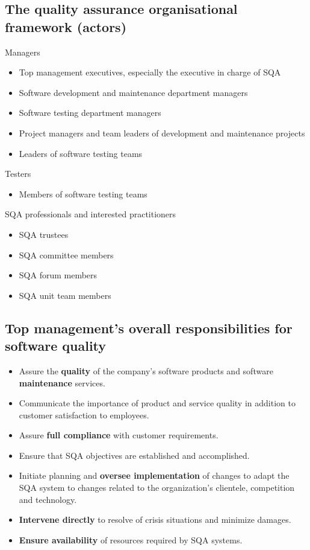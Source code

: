 \documentclass{article}
\begin{document}
\subsection{The quality assurance organisational framework (actors)}

\begin{flushleft}
Managers
\begin{itemize}
  \item Top management executives, especially the executive in charge of SQA
  \item Software development and maintenance department managers
  \item Software testing department managers
  \item Project managers and team leaders of development and maintenance projects
  \item Leaders of software testing teams
\end{itemize}
Testers
\begin{itemize}  
  \item Members of software testing teams
\end{itemize}
SQA professionals and interested practitioners
\begin{itemize}
  \item SQA trustees
  \item SQA committee members
  \item SQA forum members
  \item SQA unit team members
\end{itemize}
\end{flushleft}

\subsection{Top management’s overall responsibilities for software quality}

\begin{itemize}
  \item Assure the \textbf{quality} of the company’s software products and software \textbf{maintenance} services.
  \item Communicate the importance of product and service quality in addition to customer satisfaction to employees.
  \item Assure \textbf{full compliance} with customer requirements.
  \item Ensure that SQA objectives are established and accomplished.
  \item Initiate planning and \textbf{oversee implementation} of changes to adapt the SQA system to changes related to the organization's clientele, competition and technology.
  \item \textbf{Intervene directly} to resolve of crisis situations and minimize damages.
  \item \textbf{Ensure availability} of resources required by SQA systems.
\end{itemize}
\end{document}
